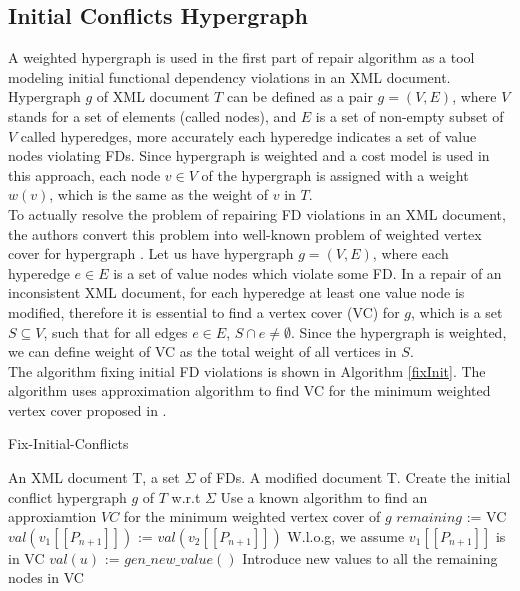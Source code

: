 \subsection{Initial Conflicts Hypergraph}

A weighted hypergraph is used in the first part of repair algorithm as a tool modeling initial functional dependency violations in an XML document. Hypergraph $g$ of XML document $T$ can be defined as a pair $g = (V,E)$, where $V$ stands for a set of elements (called nodes), and $E$ is a set of non-empty subset of $V$ called hyperedges, more accurately each hyperedge indicates a set of value nodes violating FDs. Since hypergraph is weighted and a cost model is used in this approach, each node $v \in V$ of the hypergraph is assigned with a weight $w(v)$, which is the same as the weight of $v$ in $T$.\\

To actually resolve the problem of repairing FD violations in an XML document, the authors convert this problem into well-known problem of weighted vertex cover for hypergraph \cite{ApproxAlgo}. Let us have hypergraph $g = (V,E)$, where each hyperedge $e \in E$ is a set of value nodes which violate some FD. In a repair of an inconsistent XML document, for each hyperedge at least one value node is modified, therefore it is essential to find a vertex cover (VC) for $g$, which is a set $S \subseteq V$, such that for all edges $e \in E$, $S \cap e \neq \emptyset$. Since the hypergraph is weighted, we can define weight of VC as the total weight of all vertices in $S$.\\

The algorithm fixing initial FD violations is shown in Algorithm \ref{fixInit}. The algorithm uses approximation algorithm to find VC for the minimum weighted vertex cover proposed in \cite{ApproxAlgo}.

\begin{algorithm}
\caption{Fix-Initial-Conflicts}
\label{fixInit}
\begin{algorithmic}[1]
\REQUIRE An XML document T, a set $\Sigma$ of FDs.
\ENSURE A modified document T.
\STATE Create the initial conflict hypergraph $g$ of $T$ w.r.t $\Sigma$
\STATE Use a known algorithm to find an approxiamtion $VC$ for the minimum weighted vertex cover of $g$
\STATE $remaining$ := VC
\STATE $val(v_1[\![P_{n+1}]\!])$ := $val(v_2[\![P_{n+1}]\!])$ \COMMENT W.l.o.g, we assume $v_1[\![P_{n+1}]\!]$ is in VC
\ENDWHILE
{}
\STATE $val(u)$ := $gen\_new\_value()$
\STATE \COMMENT Introduce new values to all the remaining nodes in VC
\ENDFOR
\end{algorithmic}
\end{algorithm}

